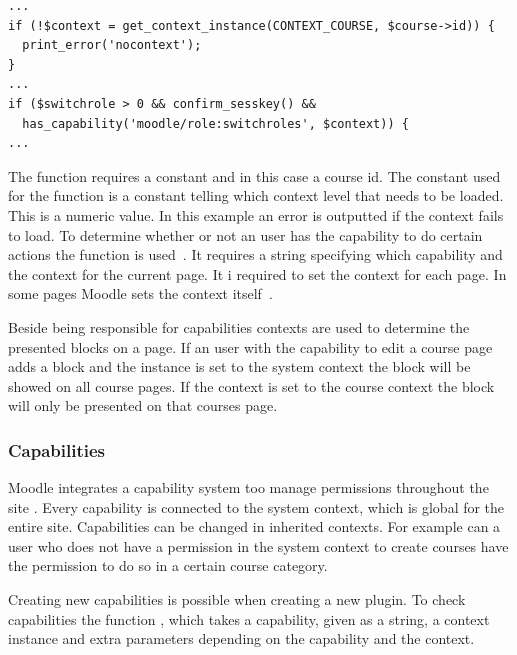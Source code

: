 \begin{lstlisting}[style=phpCode, caption=\myCaption{A snippet from \moodlefile{/course/view.php}}, label=courseviewcontextsnippet]
...
if (!$context = get_context_instance(CONTEXT_COURSE, $course->id)) {
  print_error('nocontext');
}
...
if ($switchrole > 0 && confirm_sesskey() &&
  has_capability('moodle/role:switchroles', $context)) {
...	
\end{lstlisting}
The function  requires a constant and in this case a course id. 
The constant used for the function is a constant telling which context level that needs to be loaded. 
This is a numeric value. 
In this example an error is outputted if the context fails to load. 
To determine whether or not an user has the capability to do certain actions the function  is used~\cite{moodlerolesandmodules}. It requires a string specifying which capability and the context for the current page. 
It i required to set the context for each page. 
In some pages Moodle sets the context itself~\cite{moodlepageapi}. 

Beside being responsible for capabilities contexts are used to determine the presented blocks on a page. If an user with the capability to edit a course page adds a block and the instance is set to the system context the block will be showed on all course pages. If the context is set to the course context the block will only be presented on that courses page. 

	
\subsubsection{Capabilities}
\label{sub:capabilities}
Moodle integrates a capability system too manage permissions throughout the site \cite{moodlerolesandmodules}. 
Every capability is connected to the system context, which is global for the entire site. 
Capabilities can be changed in inherited contexts. 
For example can a user who does not have a permission in the system context to create courses have the permission to do so in a certain course category. 

Creating new capabilities is possible when creating a new plugin. 
To check capabilities the function , which takes a capability, given as a string, a context instance and extra parameters depending on the capability and the context. 


	